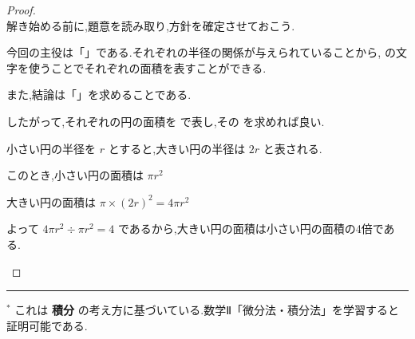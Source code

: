 \begin{proof}\mbox{}\\
  解き始める前に,題意を読み取り,方針を確定させておこう.

  今回の主役は「\fitblankbf[大きい円と小さい円の面積]{}」である.それぞれの半径の関係が与えられていることから,
  \fitblankbf[1種類]{} の文字を使うことでそれぞれの面積を表すことができる.

  また,結論は「\fitblankbf[大きい円の面積は小さい円の面積の何倍か]{}」を求めることである.

  したがって,それぞれの円の面積を \fitblankbf[文字]{} で表し,その  を求めれば良い.
\vspace{2em}

  \begin{hiddenanswer}
  小さい円の半径を $r$ とすると,大きい円の半径は $2r$ と表される.

  このとき,小さい円の面積は $\pi r^2$

  大きい円の面積は $\pi \times (2r)^2 = 4\pi r^2$

  よって $4\pi r^2 \div \pi r^2 = 4$ であるから,大きい円の面積は小さい円の面積の4倍である.
  \end{hiddenanswer}
\end{proof}

\vfill
\noindent\rule{\textwidth}{0.4pt}

\noindent
$^{*}$ これは \textbf{積分} の考え方に基づいている.数学Ⅱ「微分法・積分法」を学習すると証明可能である.

\newpage

